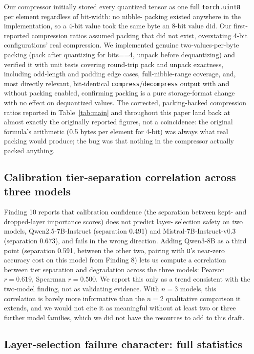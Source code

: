 \documentclass[11pt]{article}
\begin{document}
Our compressor initially stored every quantized tensor as one full
\texttt{torch.uint8} per element regardless of bit-width: no nibble-
packing existed anywhere in the implementation, so a 4-bit value took the
same byte an 8-bit value did. Our first-reported compression ratios
assumed packing that did not exist, overstating 4-bit configurations'
real compression. We implemented genuine two-values-per-byte packing
(pack after quantizing for bits==4, unpack before dequantizing) and
verified it with unit tests covering round-trip pack and unpack
exactness, including odd-length and padding edge cases, full-nibble-range
coverage, and, most directly relevant, bit-identical
\texttt{compress}/\texttt{decompress} output with and without packing
enabled, confirming packing is a pure storage-format change with no
effect on dequantized values. The corrected, packing-backed compression
ratios reported in Table~\ref{tab:main} and throughout this paper land
back at almost exactly the originally reported figures, not a
coincidence: the original formula's arithmetic (0.5 bytes per element for
4-bit) was always what real packing would produce; the bug was that
nothing in the compressor actually packed anything.

\subsection{Calibration tier-separation correlation across three models}
\label{app:calibration}

Finding 10 reports that calibration confidence (the separation between
kept- and dropped-layer importance scores) does not predict layer-
selection safety on two models, Qwen2.5-7B-Instruct (separation 0.491)
and Mistral-7B-Instruct-v0.3 (separation 0.673), and fails in the wrong
direction. Adding Qwen3-8B as a third point (separation 0.591, between
the other two, pairing with \texttt{D}'s near-zero accuracy cost on this
model from Finding 8) lets us compute a correlation between tier
separation and degradation across the three models: Pearson $r=0.619$,
Spearman $r=0.500$. We report this only as a trend consistent with the
two-model finding, not as validating evidence. With $n=3$ models, this
correlation is barely more informative than the $n=2$ qualitative
comparison it extends, and we would not cite it as meaningful without at
least two or three further model families, which we did not have the
resources to add to this draft.

\subsection{Layer-selection failure character: full statistics}
\label{app:failurechar}
\end{document}
